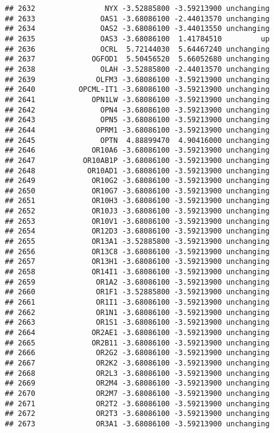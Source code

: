 \documentclass[]{article}
\begin{document}
\begin{verbatim}
## 2632                NYX -3.52885800 -3.59213900 unchanging
## 2633               OAS1 -3.68086100 -2.44013570 unchanging
## 2634               OAS2 -3.68086100 -3.44013550 unchanging
## 2635               OAS3 -3.68086100  1.41784510         up
## 2636               OCRL  5.72144030  5.64467240 unchanging
## 2637             OGFOD1  5.50456520  5.66052680 unchanging
## 2638               OLAH -3.52885800 -2.44013570 unchanging
## 2639              OLFM3 -3.68086100 -3.59213900 unchanging
## 2640          OPCML-IT1 -3.68086100 -3.59213900 unchanging
## 2641             OPN1LW -3.68086100 -3.59213900 unchanging
## 2642               OPN4 -3.68086100 -3.59213900 unchanging
## 2643               OPN5 -3.68086100 -3.59213900 unchanging
## 2644              OPRM1 -3.68086100 -3.59213900 unchanging
## 2645               OPTN  4.88899470  4.90416000 unchanging
## 2646             OR10A6 -3.68086100 -3.59213900 unchanging
## 2647           OR10AB1P -3.68086100 -3.59213900 unchanging
## 2648            OR10AD1 -3.68086100 -3.59213900 unchanging
## 2649             OR10G2 -3.68086100 -3.59213900 unchanging
## 2650             OR10G7 -3.68086100 -3.59213900 unchanging
## 2651             OR10H3 -3.68086100 -3.59213900 unchanging
## 2652             OR10J3 -3.68086100 -3.59213900 unchanging
## 2653             OR10V1 -3.68086100 -3.59213900 unchanging
## 2654             OR12D3 -3.68086100 -3.59213900 unchanging
## 2655             OR13A1 -3.52885800 -3.59213900 unchanging
## 2656             OR13C8 -3.68086100 -3.59213900 unchanging
## 2657             OR13H1 -3.68086100 -3.59213900 unchanging
## 2658             OR14I1 -3.68086100 -3.59213900 unchanging
## 2659              OR1A2 -3.68086100 -3.59213900 unchanging
## 2660              OR1F1 -3.52885800 -3.59213900 unchanging
## 2661              OR1I1 -3.68086100 -3.59213900 unchanging
## 2662              OR1N1 -3.68086100 -3.59213900 unchanging
## 2663              OR1S1 -3.68086100 -3.59213900 unchanging
## 2664             OR2AE1 -3.68086100 -3.59213900 unchanging
## 2665             OR2B11 -3.68086100 -3.59213900 unchanging
## 2666              OR2G2 -3.68086100 -3.59213900 unchanging
## 2667              OR2K2 -3.68086100 -3.59213900 unchanging
## 2668              OR2L3 -3.68086100 -3.59213900 unchanging
## 2669              OR2M4 -3.68086100 -3.59213900 unchanging
## 2670              OR2M7 -3.68086100 -3.59213900 unchanging
## 2671              OR2T2 -3.68086100 -3.59213900 unchanging
## 2672              OR2T3 -3.68086100 -3.59213900 unchanging
## 2673              OR3A1 -3.68086100 -3.59213900 unchanging

\end{verbatim}
\end{document}
